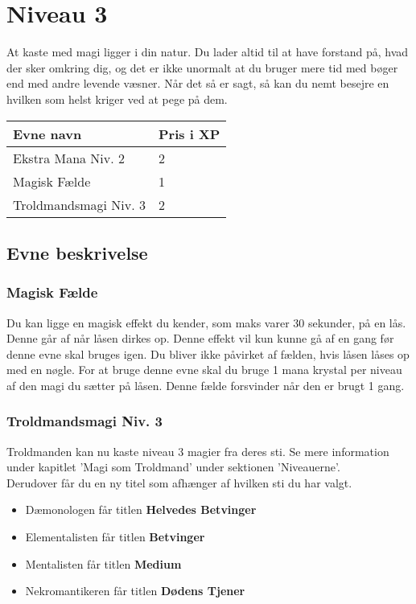 \chapter{Niveau 3}
At kaste med magi ligger i din natur. Du lader altid til at have forstand på, hvad der sker omkring dig, og det er ikke unormalt at du bruger mere tid med bøger end med andre levende væsner. Når det så er sagt, så kan du nemt besejre en hvilken som helst kriger ved at pege på dem.

\begin{table}[H]
    \centering
    \begin{tabular}{|p{}|p{}|}
    \rowcolor{cerulean!80}\hline
        Evne navn & Pris i XP \\\hline
        Ekstra Mana Niv. 2 & 2\\\hline
        Magisk Fælde & 1\\\hline 
        Troldmandsmagi Niv. 3 & 2\\\hline
    \end{tabular}
\end{table}
\section*{Evne beskrivelse}




\subsection{Magisk Fælde}
Du kan ligge en magisk effekt du kender, som maks varer 30 sekunder, på en lås. Denne går af når låsen dirkes op. Denne effekt vil kun kunne gå af en gang før denne evne skal bruges igen. Du bliver ikke påvirket af fælden, hvis låsen låses op med en nøgle. For at bruge denne evne skal du bruge 1 mana krystal per niveau af den magi du sætter på låsen. Denne fælde forsvinder når den er brugt 1 gang.


\subsection{Troldmandsmagi Niv. 3}
Troldmanden kan nu kaste niveau 3 magier fra deres sti. Se mere information under kapitlet 'Magi som Troldmand' under sektionen 'Niveauerne'. \\
Derudover får du en ny titel som afhænger af hvilken sti du har valgt.\\
\begin{itemize}
    \item Dæmonologen får titlen \textbf{Helvedes Betvinger}
    \item Elementalisten får titlen \textbf{Betvinger}
    \item Mentalisten får titlen \textbf{Medium}
    \item Nekromantikeren får titlen \textbf{Dødens Tjener}
\end{itemize}